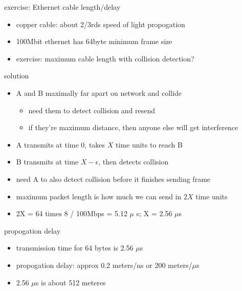 \begin{frame}{exercise: Ethernet cable length/delay}
    \begin{itemize}
    \item copper cable: about 2/3rds speed of light propogation
    \item 100Mbit ethernet has 64byte minimum frame size
    \vspace{.5cm}
    \item exercise: maximum cable length with collision detection?
    \end{itemize}
\end{frame}

\begin{frame}{solution}
\begin{itemize}
\item A and B maximally far apart on network and collide
    \begin{itemize}
    \item need them to detect collision and resend
    \item if they're maximum distance, then anyone else will get interference
    \end{itemize}
\item A transmits at time 0, takes $X$ time units to reach B
\item B transmits at time $X-\epsilon$, then detects collision
\item need A to also detect collision before it finishes sending frame
\item maximum packet length is how much we can send in $2X$ time units
\item 2X = 64 times 8 / 100Mbps  = 5.12 $\mu$ s; X = 2.56 $\mu$s
\end{itemize}
\end{frame}

\begin{frame}{propogation delay}
\begin{itemize}
\item transmission time for 64 bytes is 2.56 $\mu$s
\item propogation delay: approx 0.2 meters/ns or 200 meters/$\mu$s
\item 2.56 $\mu$s is about 512 meteres
\end{itemize}
\end{frame}


